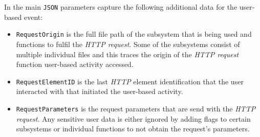 In  the main \texttt{JSON} parameters capture the following additional data for the user-based event:

\begin{itemize}
	\item \texttt{RequestOrigin} is the full file path of the subsystem that is being used and functions to fulfil the \textit{HTTP request}. Some of the subsystems consist of multiple individual files and this traces the origin of the \textit{HTTP request} function user-based activity accessed.
	\item \texttt{RequestElementID} is the last \textit{HTTP} element identification that the user interacted with that initiated the user-based activity.
	\item \texttt{RequestParameters} is the request parameters that are send with the \textit{HTTP request}. Any sensitive user data is either ignored by adding flags to certain subsystems or individual functions to not obtain the request's parameters.
\end{itemize}

